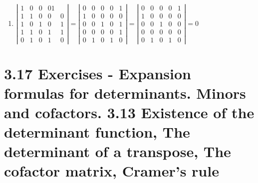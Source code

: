 \documentclass[twoside]{amsart}
\theoremstyle{plain}
\theoremstyle{definition}
\begin{document}
\begin{enumerate}
\item $\left| \begin{matrix} 1 & 0 & 0 & 0 1 \\ 1 & 1 & 0 & 0 & 0 \\ 1 & 0 & 1 & 0 & 1 \\ 1 & 1 & 0 & 1 & 1 \\ 0 & 1 & 0 & 1 & 0 \end{matrix} \right| = \left| \begin{matrix} 0 & 0 & 0 & 0 & 1 \\ 1 & 0 & 0 & 0 & 0 \\ 0 & 0 & 1 & 0 & 1 \\ 0 & 0 & 0 & 0 & 1 \\ 0 & 1 & 0 & 1 & 0 \end{matrix} \right| = \left| \begin{matrix} 0 & 0 & 0 & 0 & 1 \\ 1 & 0 & 0 & 0 & 0 \\ 0 & 0 & 1 & 0 & 0 \\ 0 & 0 & 0 & 0 & 0 \\ 0 & 1 & 0 & 1 & 0 \end{matrix} \right| = 0 $
\end{enumerate}

\section*{ 3.17 Exercises - Expansion formulas for determinants.  Minors and cofactors.  3.13 Existence of the determinant function, The determinant of a transpose, The cofactor matrix, Cramer's rule }
\end{document}
